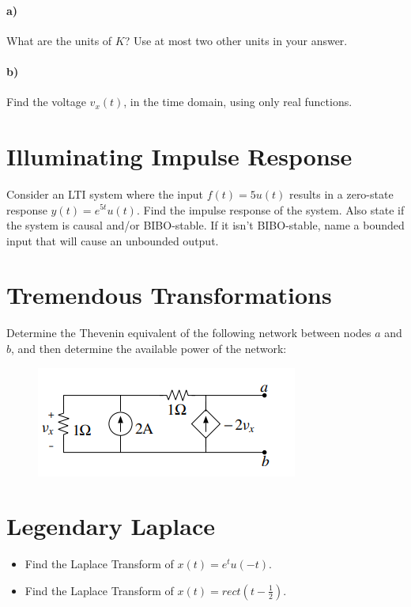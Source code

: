 \documentclass{article}
\begin{document}
\paragraph{a)} What are the units of $K$? Use at most two other units in your answer.

\paragraph{b)} Find the voltage $v_x(t)$, in the time domain, using only real functions.

\vfill

\section{Illuminating Impulse Response}

Consider an LTI system where the input $f(t) = 5u(t)$ results in a zero-state response $y(t) = e^{5t}u(t)$. Find the impulse response of the system. Also state if the system is causal and/or BIBO-stable. If it isn't BIBO-stable, name a bounded input that will cause an unbounded output.

\vfill
\newpage


\section{Tremendous Transformations}

Determine the Thevenin equivalent of the following network between nodes $a$ and $b$, and then determine the available power of the network:

\begin{figure}[h]
\begin{center}
    \includegraphics[width=0.5 
    \textwidth]{figures/qqqq.PNG}
\end{center}
\end{figure}

\vfill

\section{Legendary Laplace}

\begin{itemize}
    \item Find the Laplace Transform of $x(t) = e^t u(-t)$.
    \item Find the Laplace Transform of $x(t) = rect(t - \frac{1}{2})$.
\end{itemize}
\end{document}
